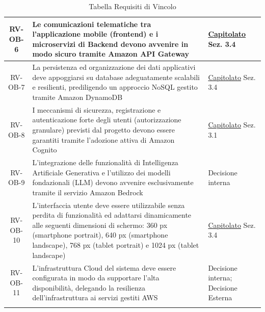 \documentclass[a4paper,12pt]{article}
\newcommand{\ignoreglossary}{}
\begin{document}
\begin{center}
\begin{longtable}{|c|p{8.5cm}|>{\centering\arraybackslash}p{4cm}|}
\hline
\rowcolor{gray!20}
RV-OB-6 & Le comunicazioni telematiche tra l'applicazione mobile (frontend) e i microservizi di Backend devono avvenire in modo sicuro tramite Amazon API Gateway & \href{https://www.math.unipd.it/~tullio/IS-1/2025/Progetto/C4.pdf}{Capitolato} \newline Sez. 3.4 \\
\hline
\rowcolor{white}
RV-OB-7 & La persistenza ed organizzazione dei dati applicativi deve appoggiarsi su database adeguatamente scalabili e resilienti, prediligendo un approccio NoSQL gestito tramite Amazon DynamoDB & \href{https://www.math.unipd.it/~tullio/IS-1/2025/Progetto/C4.pdf}{Capitolato} \newline Sez. 3.4 \\
\hline
\rowcolor{gray!20}
RV-OB-8 & I meccanismi di sicurezza, registrazione e autenticazione forte degli utenti (autorizzazione granulare) previsti dal progetto devono essere garantiti tramite l'adozione attiva di Amazon Cognito & \href{https://www.math.unipd.it/~tullio/IS-1/2025/Progetto/C4.pdf}{Capitolato} \newline Sez. 3.1 \\
\hline
\rowcolor{white}
RV-OB-9 & L'integrazione delle funzionalità di Intelligenza Artificiale Generativa e l'utilizzo dei modelli fondazionali (LLM) devono avvenire esclusivamente tramite il servizio Amazon Bedrock & Decisione interna \\
\hline
\rowcolor{gray!20}
RV-OB-10 & L'interfaccia \ignoreglossary{utente} deve essere utilizzabile senza perdita di funzionalità ed adattarsi dinamicamente alle seguenti dimensioni di schermo: 360 px (smartphone portrait), 640 px (smartphone landscape), 768 px (tablet portrait) e 1024 px (tablet landscape) & \href{https://www.math.unipd.it/~tullio/IS-1/2025/Progetto/C4.pdf}{Capitolato} \newline Sez. 3.4 \\
\hline
\rowcolor{white}
RV-OB-11 & L'infrastruttura Cloud del sistema deve essere configurata in modo da supportare l'alta disponibilità, delegando la resilienza dell'infrastruttura ai servizi gestiti AWS & Decisione interna; Decisione Esterna \\
\hline
\caption{Tabella Requisiti di Vincolo} \label{tab:requisiti_vincolo} \\
\end{longtable}
\end{center}
\end{document}
